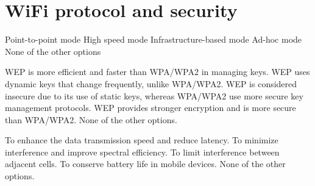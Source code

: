 \section{WiFi protocol and security}

\begin{checkboxes}
    \choice Point-to-point mode
    \choice High speed mode
    \CorrectChoice Infrastructure-based mode
    \CorrectChoice Ad-hoc mode
    \choice None of the other options

\end{checkboxes}



\begin{checkboxes}
    \choice WEP is more efficient and faster than WPA/WPA2 in managing keys.
    \choice WEP uses dynamic keys that change frequently, unlike WPA/WPA2.
    \CorrectChoice WEP is considered insecure due to its use of static keys, whereas WPA/WPA2 use more secure key management protocols.
    \choice WEP provides stronger encryption and is more secure than WPA/WPA2.
    \choice None of the other options.
\end{checkboxes}



\begin{checkboxes}
    \choice To enhance the data transmission speed and reduce latency.
    \CorrectChoice To minimize interference and improve spectral efficiency.
    \choice To limit interference between adjacent cells.
    \choice To conserve battery life in mobile devices.
    \choice None of the other options.
\end{checkboxes}



